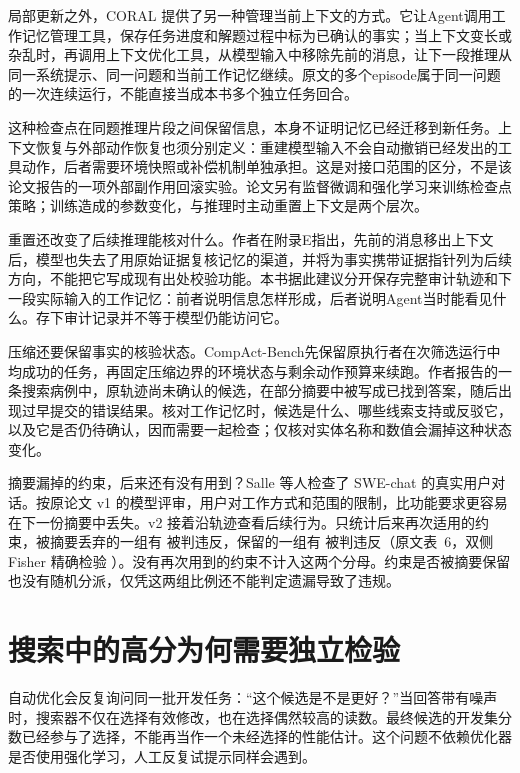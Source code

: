 局部更新之外，CORAL 提供了另一种管理当前上下文的方式\cite{coral-2610}。它让Agent调用工作记忆管理工具，保存任务进度和解题过程中标为已确认的事实；当上下文变长或杂乱时，再调用上下文优化工具，从模型输入中移除先前的消息，让下一段推理从同一系统提示、同一问题和当前工作记忆继续。原文的多个episode属于同一问题的一次连续运行，不能直接当成本书多个独立任务回合。

这种检查点在同题推理片段之间保留信息，本身不证明记忆已经迁移到新任务。上下文恢复与外部动作恢复也须分别定义：重建模型输入不会自动撤销已经发出的工具动作，后者需要环境快照或补偿机制单独承担。这是对接口范围的区分，不是该论文报告的一项外部副作用回滚实验。论文另有监督微调和强化学习来训练检查点策略；训练造成的参数变化，与推理时主动重置上下文是两个层次\cite{coral-2610}。

重置还改变了后续推理能核对什么。作者在附录E指出，先前的消息移出上下文后，模型也失去了用原始证据复核记忆的渠道，并将为事实携带证据指针列为后续方向，不能把它写成现有出处校验功能\cite{coral-2610}。本书据此建议分开保存完整审计轨迹和下一段实际输入的工作记忆：前者说明信息怎样形成，后者说明Agent当时能看见什么。存下审计记录并不等于模型仍能访问它。

压缩还要保留事实的核验状态。CompAct-Bench先保留原执行者在次筛选运行中均成功的任务，再固定压缩边界的环境状态与剩余动作预算来续跑。作者报告的一条搜索病例中，原轨迹尚未确认的候选，在部分摘要中被写成已找到答案，随后出现过早提交的错误结果\cite{compact-bench-2611}。核对工作记忆时，候选是什么、哪些线索支持或反驳它，以及它是否仍待确认，因而需要一起检查；仅核对实体名称和数值会漏掉这种状态变化。

摘要漏掉的约束，后来还有没有用到？Salle 等人检查了 SWE-chat 的真实用户对话。按原论文 v1 的模型评审，用户对工作方式和范围的限制，比功能要求更容易在下一份摘要中丢失\cite{compaction-friendly-2610}。v2 接着沿轨迹查看后续行为。只统计后来再次适用的约束，被摘要丢弃的一组有  被判违反，保留的一组有  被判违反（原文表~6，双侧 Fisher 精确检验 ）\cite{compaction-friendly-2610-v2}。没有再次用到的约束不计入这两个分母。约束是否被摘要保留也没有随机分派，仅凭这两组比例还不能判定遗漏导致了违规。

\section{搜索中的高分为何需要独立检验}
\label{sec:ch07-selection}

自动优化会反复询问同一批开发任务：“这个候选是不是更好？”当回答带有噪声时，搜索器不仅在选择有效修改，也在选择偶然较高的读数。最终候选的开发集分数已经参与了选择，不能再当作一个未经选择的性能估计。这个问题不依赖优化器是否使用强化学习，人工反复试提示同样会遇到。

